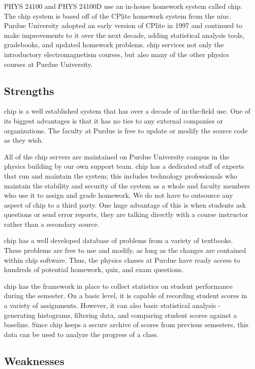 PHYS 24100 and PHYS 24100D use an in-house homework system called \gls{chip}. The \gls{chip} system is based off of the CPlite homework system from the \gls{uiuc}. Purdue University adopted an early version of CPlite in 1997 and continued to make improvements to it over the next decade, adding statistical analysis tools, gradebooks, and updated homework problems. \gls{chip} services not only the introductory electromagnetism courses, but also many of the other physics courses at Purdue University.

\subsection{Strengths}

\gls{chip} is a well established system that has over a decade of in-the-field use. One of its biggest advantages is that it has no ties to any external companies or organizations. The faculty at Purdue is free to update or modify the source code as they wish.

All of the \gls{chip} servers are maintained on Purdue University campus in the physics building by our own support team. \gls{chip} has a dedicated staff of experts that run and maintain the system; this includes technology professionals who maintain the stability and security of the system as a whole and faculty members who use it to assign and grade homework. We do not have to outsource any aspect of \gls{chip} to a third party. One huge advantage of this is when students ask questions or send error reports, they are talking directly with a course instructor rather than a secondary source.

\gls{chip} has a well developed database of problems from a variety of textbooks. These problems are free to use and modify, as long as the changes are contained within \gls{chip} software. Thus, the physics classes at Purdue have ready access to hundreds of potential homework, quiz, and exam questions.

\gls{chip} has the framework in place to collect statistics on student performance during the semester. On a basic level, it is capable of recording student scores in a variety of assignments. However, it can also basic statistical analysis - generating histograms, filtering data, and comparing student scores against a baseline. Since \gls{chip} keeps a secure archive of scores from previous semesters, this data can be used to analyze the progress of a class.

\subsection{Weaknesses}

